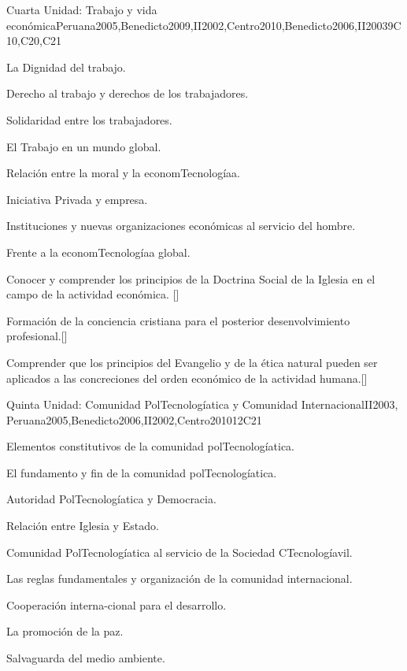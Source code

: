 \begin{syllabus}
\begin{unit}{}{Cuarta Unidad: Trabajo y vida económica}{Peruana2005,Benedicto2009,II2002,Centro2010,Benedicto2006,II2003}{9}{C10,C20,C21}
\begin{topics}
	\item La Dignidad del trabajo.
	\item Derecho al trabajo y derechos de los trabajadores.
	\item Solidaridad entre los trabajadores.
	\item El Trabajo en un mundo global.
	\item Relación entre la moral y la economTecnologíaa.
	\item Iniciativa Privada y empresa.
	\item Instituciones y nuevas organizaciones económicas al servicio del hombre.
	\item Frente a la economTecnologíaa global.
\end{topics}
\begin{learningoutcomes}
	\item Conocer y comprender los principios de la Doctrina Social de la Iglesia en el campo de la actividad económica. [\Familiarity]
	\item Formación de la conciencia cristiana para el posterior desenvolvimiento profesional.[\Usage]
	\item Comprender que los principios del Evangelio y de la ética natural pueden ser aplicados  a las concreciones del orden económico de la actividad humana.[\Familiarity]
\end{learningoutcomes}
\end{unit}

\begin{unit}{}{Quinta Unidad: Comunidad PolTecnologíatica y Comunidad Internacional}{II2003, Peruana2005,Benedicto2006,II2002,Centro2010}{12}{C21}
\begin{topics}
	\item Elementos constitutivos de la comunidad polTecnologíatica.
	\item El fundamento y fin de la comunidad polTecnologíatica.
	\item Autoridad PolTecnologíatica y Democracia.
	\item Relación entre Iglesia y Estado.
	\item Comunidad PolTecnologíatica al servicio de la Sociedad CTecnologíavil.
	\item Las reglas fundamentales y organización de la comunidad internacional.
	\item Cooperación interna-cional para el desarrollo.
	\item La promoción de la paz.
	\item Salvaguarda del medio ambiente.


\end{topics}
\end{unit}
\end{syllabus}
